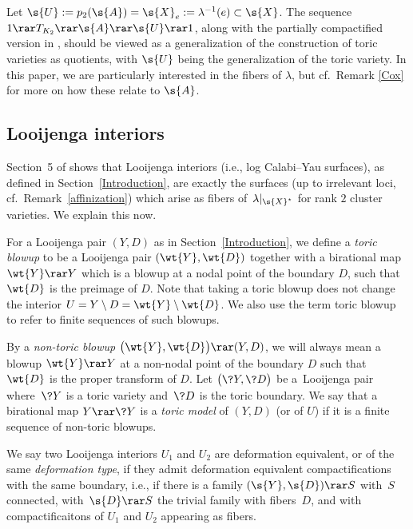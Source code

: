 Let $\s{U}:=p_2(\s{A})=\s{X}_e:=\lambda^{-1}(e)\subset \s{X}$. The sequence $1\rar T_{K_2} \rar \s{A} \rar \s{U} \rar 1$, along with the partially compactified version in \cite[Section~2]{ManCox}, should be viewed as a generalization of the construction of toric varieties as quotients, with $\s{U}$ being the generalization of the toric variety.
 In this paper, we are particularly interested in the fibers of $\lambda$, but cf.\ Remark \ref{Cox} for more on how these relate to $\s{A}$.

\subsection{Looijenga interiors}\label{Looijenga seeds}

Section~5 of \cite{GHK3} shows that Looijenga interiors (i.e., log Calabi--Yau surfaces), as defined in Section~\ref{Introduction}, are exactly the surfaces (up to irrelevant loci, cf.\ Remark~\ref{affinization}) which arise as fibers of~$\lambda|_{\s{X}^{\star}}$ for rank $2$ cluster varieties. We explain this now.

\begin{dfns}
For a Looijenga pair $(Y,D)$ as in Section~\ref{Introduction}, we define a {\it toric blowup} to be a Looijenga pair $(\wt{Y},\wt{D})$ together with a birational map $\wt{Y}\rar Y$ which is a blowup at a nodal point of the boundary $D$, such that $\wt{D}$ is the preimage of $D$. Note that taking a toric blowup does not change the interior $U = Y\setminus D = \wt{Y}\setminus \wt{D}$. We also use the term toric blowup to refer to finite sequences of such blowups.

By a {\it non-toric blowup} $\big(\wt{Y},\wt{D}\big)\rar (Y,D)$, we will always mean a blowup $\wt{Y}\rar Y$ at a non-nodal point of the boundary $D$ such that $\wt{D}$ is the proper transform of $D$. Let $\big(\?{Y},\?{D}\big)$ be a~Looijenga pair where~$\?{Y}$ is a toric variety and~$\?{D}$ is the toric boundary. We say that a birational map $Y \rar \?{Y}$ is a {\it toric model} of $(Y,D)$ (or of $U$) if it is a finite sequence of non-toric blowups.

We say two Looijenga interiors $U_1$ and $U_2$ are deformation equivalent, or of the same \textit{deformation type}, if they admit deformation equivalent compactifications with the same boundary, i.e., if there is a family $(\s{Y},\s{D}) \rar S$ with~$S$ connected, with~$\s{D}\rar S$ the trivial family with fibers~$D$, and with compactificaitons of $U_1$ and $U_2$ appearing as fibers.
\end{dfns}

